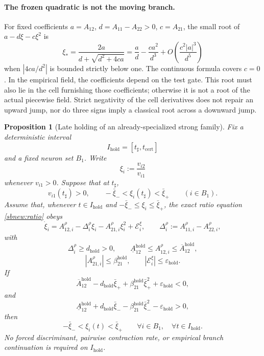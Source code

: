 \documentclass{article} %
\theoremstyle{plain}
\newtheorem{proposition}[theorem]{Proposition}
\theoremstyle{definition}
\theoremstyle{remark}
\begin{document}
\paragraph{The frozen quadratic is not the moving branch.}
For fixed coefficients $a=A_{12}$, $d=A_{11}-A_{22}>0$, $c=A_{21}$,
the small root of $a-d\xi-c\xi^2$ is
\[
 \xi_* =\frac{2a}{d+\sqrt{d^2+4ca}}
 =\frac ad-\frac{ca^2}{d^3}
   +O\!\left(\frac{c^2|a|^3}{d^5}\right)
\]
when $|4ca/d^2|$ is bounded strictly below one. The continuous formula
covers $c=0$. In the empirical field, the coefficients depend on the test
gate. This root must also lie in the cell furnishing those coefficients;
otherwise it is not a root of the actual piecewise field.
Strict negativity of the cell derivatives does not repair an upward jump,
nor do three signs imply a classical root across a downward jump.


\begin{proposition}[Late holding of an already-specialized strong family]
\label{prop:late-strong-holding}
Fix a deterministic interval
\[
I_{\mathrm{hold}}=[t_{\sharp},t_{\mathrm{cert}}]
\]
and a fixed neuron set $B_1$.  Write
\[
\xi_i:=\frac{v_{i2}}{v_{i1}}
\]
whenever $v_{i1}>0$.  Suppose that at $t_{\sharp}$,
\[
v_{i1}(t_{\sharp})>0,
\qquad
-\bar\xi_-<\xi_i(t_{\sharp})<\bar\xi_+
\qquad(i\in B_1).
\]
Assume that, whenever $t\in I_{\mathrm{hold}}$ and
$-\bar\xi_-\le\xi_i\le\bar\xi_+$, the exact ratio equation
\eqref{sbnew:ratio} obeys
\[
\dot\xi_i
=
A_{12,i}^\rho-\Delta_i^\rho\xi_i-A_{21,i}^\rho\xi_i^2+\mathcal E_i^\xi,
\qquad
\Delta_i^\rho:=A_{11,i}^\rho-A_{22,i}^\rho,
\]
with
\[
\Delta_i^\rho\ge d_{\mathrm{hold}}>0,
\qquad
\underline A_{12}^{\mathrm{hold}}
\le A_{12,i}^\rho
\le\overline A_{12}^{\mathrm{hold}},
\]
\[
|A_{21,i}^\rho|\le\beta_{21}^{\mathrm{hold}},
\qquad
|\mathcal E_i^\xi|\le\varepsilon_{\mathrm{hold}}.
\]
If
\[
\boxed{
\overline A_{12}^{\mathrm{hold}}
-d_{\mathrm{hold}}\bar\xi_+
+\beta_{21}^{\mathrm{hold}}\bar\xi_+^2
+\varepsilon_{\mathrm{hold}}<0,
}
\tag{late-hold-plus}\label{eq:late-hold-plus}
\]
and
\[
\boxed{
\underline A_{12}^{\mathrm{hold}}
+d_{\mathrm{hold}}\bar\xi_-
-\beta_{21}^{\mathrm{hold}}\bar\xi_-^2
-\varepsilon_{\mathrm{hold}}>0,
}
\tag{late-hold-minus}\label{eq:late-hold-minus}
\]
then
\[
\boxed{
-\bar\xi_-<\xi_i(t)<\bar\xi_+
\qquad
\forall i\in B_1,\quad \forall t\in I_{\mathrm{hold}}.
}
\tag{late-hold-cone}\label{eq:late-hold-cone}
\]
No forced discriminant, pairwise contraction rate, or empirical branch
continuation is required on $I_{\mathrm{hold}}$.
\end{proposition}
\end{document}
